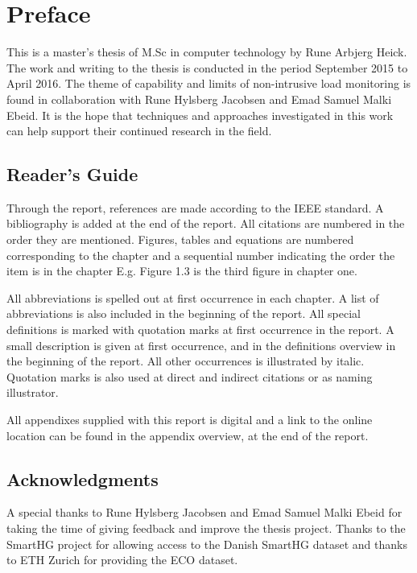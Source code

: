 \chapter*{Preface}
This is a master's thesis of M.Sc in computer technology by Rune Arbjerg Heick. The work and writing to the thesis is conducted in the period September 2015 to April 2016. The theme of capability and limits of non-intrusive load monitoring is found in collaboration with Rune
Hylsberg Jacobsen and Emad Samuel Malki Ebeid. It is the hope that techniques and approaches investigated in this work can help support their continued research in the field.

\section*{Reader's Guide}
Through the report, references are made according to the IEEE standard. A bibliography is added at the end of the report. All citations are numbered in the order they are mentioned. Figures, tables and equations are numbered corresponding to the chapter and a sequential number indicating the order the item is in the chapter E.g. Figure 1.3 is the third figure in chapter one.  

All abbreviations is spelled out at first occurrence in each chapter. A list of abbreviations is also included in the beginning of the report. All special definitions is marked with quotation marks at first occurrence in the report. A small description is given at first occurrence, and in the definitions overview in the beginning of the report. All other occurrences is illustrated by italic. Quotation marks is also used at direct and indirect citations or as naming illustrator. 

All appendixes supplied with this report is digital and a link to the online location can be found in the appendix overview, at the end of the report.  

\section*{Acknowledgments}
A special thanks to Rune Hylsberg Jacobsen and Emad Samuel Malki Ebeid for taking the time of giving feedback and improve the thesis project. Thanks to the SmartHG project for allowing access to the Danish SmartHG dataset and thanks to ETH Zurich for providing the ECO dataset. 